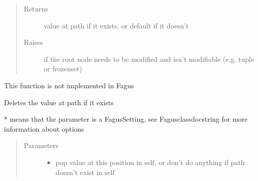 \documentclass[a4paper,10pt,english]{sphinxmanual}
\begin{document}
\begin{fulllineitems}
\begin{fulllineitems}
\begin{quote}
\begin{description}
\begin{itemize}
\end{itemize}

\item[{Returns}] \leavevmode
\sphinxAtStartPar
value at path if it exists, or default if it doesn’t

\item[{Raises}] \leavevmode
\sphinxAtStartPar
{} \textendash{} if the root node needs to be modified and isn’t modifiable (e.g. tuple or frozenset)

\end{description}\end{quote}

\end{fulllineitems}


\begin{fulllineitems}
\label{\detokenize{fagus.fagus:fagus.fagus.Fagus.popitem}}
\pysigstartsignatures
{}
\pysigstopsignatures
\sphinxAtStartPar
This function is not implemented in Fagus

\end{fulllineitems}


\begin{fulllineitems}
\label{\detokenize{fagus.fagus:fagus.fagus.Fagus.discard}}
\pysigstartsignatures
{}
\pysigstopsignatures
\sphinxAtStartPar
Deletes the value at path if it exists

\sphinxAtStartPar
* means that the parameter is a Fagus\sphinxhyphen{}Setting, see Fagus\sphinxhyphen{}class\sphinxhyphen{}docstring for more information about options
\begin{quote}\begin{description}
\item[{Parameters}] \leavevmode\begin{itemize}
\item {}
\sphinxAtStartPar
{} \textendash{} pop value at this position in self, or don’t do anything if path doesn’t exist in self


\end{itemize}
\end{description}
\end{quote}
\end{fulllineitems}
\end{fulllineitems}
\end{document}
